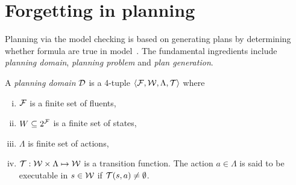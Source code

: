 \documentclass[letterpaper]{article} %
\begin{document}
%
%




\section{Forgetting in planning}
Planning via the model checking is based on generating plans by determining whether formula are true in model~\cite{giunchiglia1999planning}. The fundamental ingredients include \emph{planning domain}, \emph{planning problem} and \emph{plan generation}.

A \emph{planning domain} ${\cal D}$ is a 4-tuple ${\langle{{\cal F}, {\cal W}, \Lambda, \cal T}\rangle}$ where
\begin{enumerate}[(i)]
  \item $\cal F$ is a finite set of fluents,
  \item $W \subseteq 2^{\cal F}$ is a finite set of states,
  \item $\Lambda$ is finite set of actions,
  \item ${\cal T} : {\cal W} \times \Lambda \mapsto \cal W$ is a transition function. The action $a\in \Lambda$ is said to be executable in $s\in \cal W$ if ${\cal T}(s,a) \neq \emptyset$.
\end{enumerate}
\end{document}
